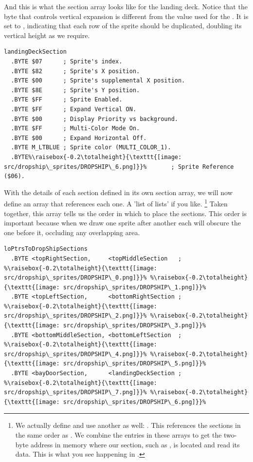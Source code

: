 And this is what the section array looks like for the landing deck. Notice that the byte that controls vertical
expansion is different from the value used for the . It is set to , indicating
that each row of the sprite should be duplicated, doubling its vertical height as we require.

\begin{lstlisting}[escapechar=\%]
landingDeckSection
  .BYTE $07      ; Sprite's index.
  .BYTE $82      ; Sprite's X position.
  .BYTE $00      ; Sprite's supplemental X position.
  .BYTE $8E      ; Sprite's Y position.
  .BYTE $FF      ; Sprite Enabled.
  .BYTE $FF      ; Expand Vertical ON.
  .BYTE $00      ; Display Priority vs background.
  .BYTE $FF      ; Multi-Color Mode On.
  .BYTE $00      ; Expand Horizontal Off.
  .BYTE M_LTBLUE ; Sprite color (MULTI_COLOR_1).
  .BYTE%\raisebox{-0.2\totalheight}{\texttt{[image: src/dropship\_sprites/DROPSHIP\_6.png]}}%       ; Sprite Reference ($06).
\end{lstlisting}

With the details of each section defined in its own section array, we will now define an array that references each one. A 'list of lists' if you like.
\footnote{We actually define and use another as well: . This references the sections in the same order as . We combine the entries in these arrays to get the two-byte address in memory where our section, such as , is located and read its data. This is what you see happening in .
}
Taken together, this array tells us the order
in which to place the sections. This order is important because when we draw one sprite after another each will obscure the one
before it, occluding any overlapping area.

\begin{lstlisting}[escapechar=\%]
loPtrsToDropShipSections
  .BYTE <topRightSection,     <topMiddleSection   ; %\raisebox{-0.2\totalheight}{\texttt{[image: src/dropship\_sprites/DROPSHIP\_0.png]}}% %\raisebox{-0.2\totalheight}{\texttt{[image: src/dropship\_sprites/DROPSHIP\_1.png]}}%
  .BYTE <topLeftSection,      <bottomRightSection ; %\raisebox{-0.2\totalheight}{\texttt{[image: src/dropship\_sprites/DROPSHIP\_2.png]}}% %\raisebox{-0.2\totalheight}{\texttt{[image: src/dropship\_sprites/DROPSHIP\_3.png]}}%
  .BYTE <bottomMiddleSection, <bottomLeftSection  ; %\raisebox{-0.2\totalheight}{\texttt{[image: src/dropship\_sprites/DROPSHIP\_4.png]}}% %\raisebox{-0.2\totalheight}{\texttt{[image: src/dropship\_sprites/DROPSHIP\_5.png]}}%
  .BYTE <bayDoorSection,      <landingDeckSection ; %\raisebox{-0.2\totalheight}{\texttt{[image: src/dropship\_sprites/DROPSHIP\_7.png]}}% %\raisebox{-0.2\totalheight}{\texttt{[image: src/dropship\_sprites/DROPSHIP\_6.png]}}%
\end{lstlisting}


